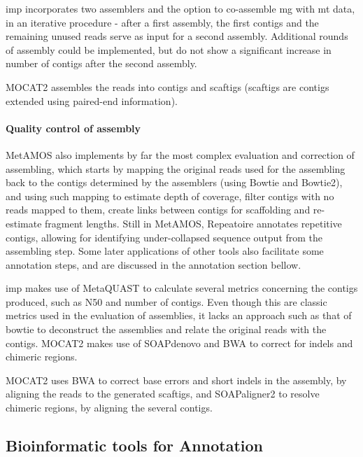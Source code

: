 \documentclass[
  oneside,
  11pt, a4paper,
  footinclude=true,
  headinclude=true,
  cleardoublepage=empty
]{scrbook}
\begin{document}
    \gls{imp} incorporates two assemblers and the option to co-assemble \gls{mg} with \gls{mt} data, in an iterative procedure - after a first assembly, the first contigs and the remaining unused reads serve as input for a second assembly. Additional rounds of assembly could be implemented, but do not show a significant increase in number of contigs after the second assembly.
    
    MOCAT2 \citep{Kultima2012} assembles the reads into contigs and scaftigs (scaftigs are contigs extended using paired-end information).
    
    \paragraph{Quality control of assembly}
    
    MetAMOS also implements by far the most complex evaluation and correction of assembling, which starts by mapping the original reads used for the assembling back to the contigs determined by the assemblers (using Bowtie and Bowtie2), and using such mapping to estimate depth of coverage, filter contigs with no reads mapped to them, create links between contigs for scaffolding and re-estimate fragment lengths. Still in MetAMOS, Repeatoire annotates repetitive contigs, allowing for identifying under-collapsed sequence output from the assembling step. Some later applications of other tools also facilitate some annotation steps, and are discussed in the annotation section bellow.
    
    \gls{imp} makes use of MetaQUAST to calculate several metrics concerning the contigs produced, such as N50 and number of contigs. Even though this are classic metrics used in the evaluation of assemblies, it lacks an approach such as that of bowtie to deconstruct the assemblies and relate the original reads with the contigs. MOCAT2 makes use of SOAPdenovo and BWA to correct for indels and chimeric regions.
    
    MOCAT2 \citep{Kultima2012} uses BWA to correct base errors and short indels in the assembly, by aligning the reads to the generated scaftigs, and SOAPaligner2 to resolve chimeric regions, by aligning the several contigs.
   
    \subsection{Bioinformatic tools for Annotation}
    
\end{document}
